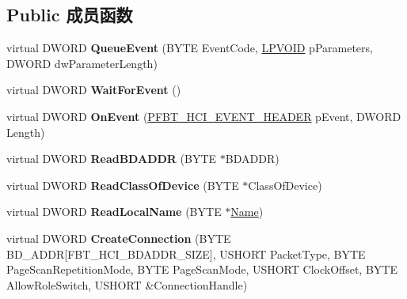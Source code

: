 \subsection*{Public 成员函数}
\begin{DoxyCompactItemize}
\item 
\mbox{\label{class_c_hci_round_trip_ace58a11f87dd893e3117ff270943bbdc}} 
virtual D\+W\+O\+RD {\bfseries Queue\+Event} (B\+Y\+TE Event\+Code, \hyperlink{interfacevoid}{L\+P\+V\+O\+ID} p\+Parameters, D\+W\+O\+RD dw\+Parameter\+Length)
\item 
\mbox{\label{class_c_hci_round_trip_a74fd8f81fc83c560a1c0d0c0bcf403de}} 
virtual D\+W\+O\+RD {\bfseries Wait\+For\+Event} ()
\item 
\mbox{\label{class_c_hci_round_trip_a4094d5b03d7a4d646100833da8c858a3}} 
virtual D\+W\+O\+RD {\bfseries On\+Event} (\hyperlink{struct_f_b_t___h_c_i___e_v_e_n_t___h_e_a_d_e_r}{P\+F\+B\+T\+\_\+\+H\+C\+I\+\_\+\+E\+V\+E\+N\+T\+\_\+\+H\+E\+A\+D\+ER} p\+Event, D\+W\+O\+RD Length)
\item 
\mbox{\label{class_c_hci_round_trip_a3d408335e4b59ca966d8dd6d7f75ecba}} 
virtual D\+W\+O\+RD {\bfseries Read\+B\+D\+A\+D\+DR} (B\+Y\+TE $\ast$B\+D\+A\+D\+DR)
\item 
\mbox{\label{class_c_hci_round_trip_a795a1c07f02486376444c67c7dbade5e}} 
virtual D\+W\+O\+RD {\bfseries Read\+Class\+Of\+Device} (B\+Y\+TE $\ast$Class\+Of\+Device)
\item 
\mbox{\label{class_c_hci_round_trip_a0e657f247290a5fba97f3f162abb9319}} 
virtual D\+W\+O\+RD {\bfseries Read\+Local\+Name} (B\+Y\+TE $\ast$\hyperlink{struct_name_rec__}{Name})
\item 
\mbox{\label{class_c_hci_round_trip_a25d6b76d53a77585eb5bf239363d60ca}} 
virtual D\+W\+O\+RD {\bfseries Create\+Connection} (B\+Y\+TE B\+D\+\_\+\+A\+D\+DR\mbox{[}F\+B\+T\+\_\+\+H\+C\+I\+\_\+\+B\+D\+A\+D\+D\+R\+\_\+\+S\+I\+ZE\mbox{]}, U\+S\+H\+O\+RT Packet\+Type, B\+Y\+TE Page\+Scan\+Repetition\+Mode, B\+Y\+TE Page\+Scan\+Mode, U\+S\+H\+O\+RT Clock\+Offset, B\+Y\+TE Allow\+Role\+Switch, U\+S\+H\+O\+RT \&Connection\+Handle)

\end{DoxyCompactItemize}
